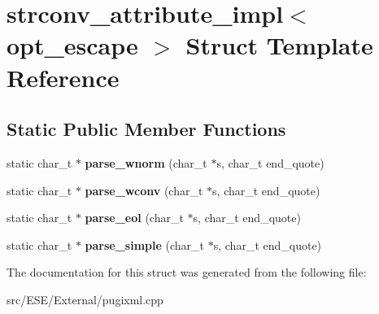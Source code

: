 \hypertarget{structstrconv__attribute__impl}{\section{strconv\-\_\-attribute\-\_\-impl$<$ opt\-\_\-escape $>$ Struct Template Reference}
\label{structstrconv__attribute__impl}
}
\subsection*{Static Public Member Functions}
\begin{DoxyCompactItemize}
\item 
\hypertarget{structstrconv__attribute__impl_a9b7f8b1e860c5d022dbd29f9a89e9e27}{static char\-\_\-t $\ast$ {\bfseries parse\-\_\-wnorm} (char\-\_\-t $\ast$s, char\-\_\-t end\-\_\-quote)}\label{structstrconv__attribute__impl_a9b7f8b1e860c5d022dbd29f9a89e9e27}

\item 
\hypertarget{structstrconv__attribute__impl_a2d39998b79896af7c53c5f3dc22a526b}{static char\-\_\-t $\ast$ {\bfseries parse\-\_\-wconv} (char\-\_\-t $\ast$s, char\-\_\-t end\-\_\-quote)}\label{structstrconv__attribute__impl_a2d39998b79896af7c53c5f3dc22a526b}

\item 
\hypertarget{structstrconv__attribute__impl_a0f57ee9d69b9d626765f4a9c8af6df2e}{static char\-\_\-t $\ast$ {\bfseries parse\-\_\-eol} (char\-\_\-t $\ast$s, char\-\_\-t end\-\_\-quote)}\label{structstrconv__attribute__impl_a0f57ee9d69b9d626765f4a9c8af6df2e}

\item 
\hypertarget{structstrconv__attribute__impl_a8358dc980178e55c8669b9dcd04872d7}{static char\-\_\-t $\ast$ {\bfseries parse\-\_\-simple} (char\-\_\-t $\ast$s, char\-\_\-t end\-\_\-quote)}\label{structstrconv__attribute__impl_a8358dc980178e55c8669b9dcd04872d7}

\end{DoxyCompactItemize}


The documentation for this struct was generated from the following file\-:\begin{DoxyCompactItemize}
\item 
src/\-E\-S\-E/\-External/pugixml.\-cpp\end{DoxyCompactItemize}
